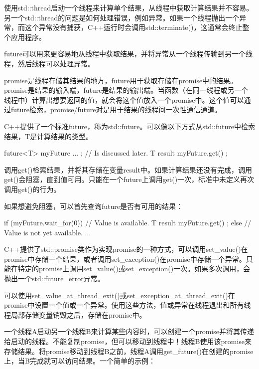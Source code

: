 
使用std::thread启动一个线程来计算单个结果，从线程中获取计算结果并不容易。另一个std::thread的问题是如何处理错误，例如异常。如果一个线程抛出一个异常，而这个异常没有捕获，C++运行时会调用std::terminate()，这通常会终止整个应用程序。

future可以用来更容易地从线程中获取结果，并将异常从一个线程传输到另一个线程，然后线程可以处理异常。

promise是线程存储其结果的地方，future用于获取存储在promise中的结果。promise是结果的输入端，future是结果的输出端。当函数（在同一线程或另一个线程中）计算出想要返回的值，就会将这个值放入一个promise中。这个值可以通过future检索，promise/future对是用于结果的线程间一次性通信通道。

C++提供了一个标准future，称为std::future。可以像以下方式从std::future中检索结果，T是计算结果的类型。

\begin{cpp}
future<T> myFuture { ... }; // Is discussed later.
T result { myFuture.get() };
\end{cpp}

调用get()检索结果，并将其存储在变量result中。如果计算结果还没有完成，调用get()会阻塞，直到值可用。只能在一个future上调用get()一次，标准中未定义再次调用get()的行为。

如果想避免阻塞，可以首先查询future是否有可用的结果：

\begin{cpp}
if (myFuture.wait_for(0)) { // Value is available.
    T result { myFuture.get() };
} else { // Value is not yet available.
    ...
}
\end{cpp}


C++提供了std::promise类作为实现promise的一种方式，可以调用set\_value()在promise中存储一个结果，或者调用set\_exception()在promise中存储一个异常。只能在特定的promise上调用set\_value()或set\_exception()一次。如果多次调用，会抛出一个std::future\_error异常。

可以使用set\_value\_at\_thread\_exit()或set\_exception\_at\_thread\_exit()在promise中设置一个值或一个异常。使用这些方法，值或异常在线程退出和所有线程局部存储变量销毁之后，存储在promise中。

一个线程A启动另一个线程B来计算某些内容时，可以创建一个promise并将其传递给启动的线程。不能复制promise，但可以移动到线程中！线程B使用该promise来存储结果。将promise移动到线程B之前，线程A调用get\_future()在创建的promise上，当B完成就可以访问结果。一个简单的示例：

